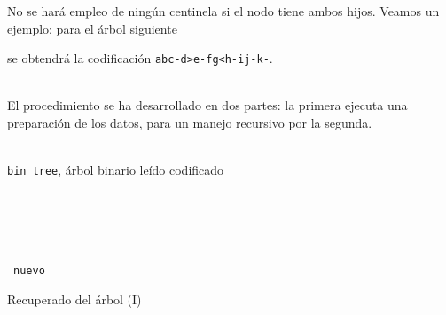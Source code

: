 \documentclass[a4paper,10pt]{scrartcl}
\begin{document}
 No se hará empleo de ningún centinela si el nodo tiene ambos hijos. Veamos un ejemplo: para el árbol siguiente
 
 
 se obtendrá la codificación \texttt{abc-d>e-fg<h-ij-k-}.\\\ %
 
 El procedimiento se ha desarrollado en dos partes: la primera ejecuta una
 preparación de los datos, para un manejo recursivo por la segunda.
  
   
      \begin{algorithm}[H]
      \begin{algorithmic}[1]
     \REQUIRE \ \\
         \texttt{bin\_tree}, árbol binario leído codificado\\\
     
     \\\
       \ELSE
         \ENDIF
       \ENDIF
     \ENDFOR
     \\\
     \\\
     \RETURN \texttt{nuevo}
      \end{algorithmic}
      \caption{Recuperado del árbol (I)}
      \label{rec1}
      \end{algorithm}
   
\end{document}
